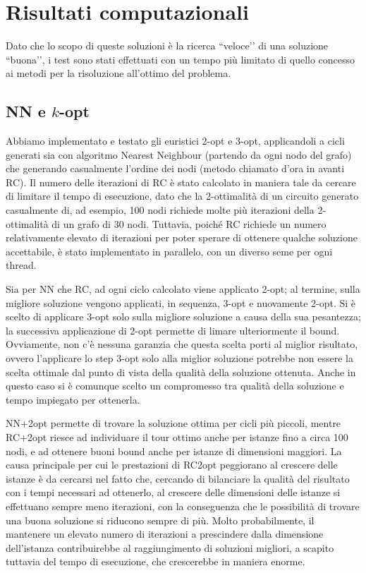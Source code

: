 \section{Risultati computazionali}
Dato che lo scopo di queste soluzioni è la ricerca ``veloce’’ di una soluzione ``buona’’, i test sono stati effettuati con un tempo più limitato di quello concesso ai metodi per la risoluzione all’ottimo del problema.
\subsection{NN e $k$-opt}
Abbiamo implementato e testato gli euristici 2-opt e 3-opt, applicandoli a cicli generati sia con algoritmo Nearest Neighbour (partendo da ogni nodo del grafo) che generando casualmente l’ordine dei nodi (metodo chiamato d’ora in avanti RC). Il numero delle iterazioni di RC è stato calcolato in maniera tale da cercare di limitare il tempo di esecuzione, dato che la 2-ottimalità di un circuito generato casualmente di, ad esempio, 100 nodi richiede molte più iterazioni della 2-ottimalità di un grafo di 30 nodi. Tuttavia, poiché RC richiede un numero relativamente elevato di iterazioni per poter sperare di ottenere qualche soluzione accettabile, è stato implementato in parallelo, con un diverso seme per ogni thread.

Sia per NN che RC, ad ogni ciclo calcolato viene applicato 2-opt; al termine, sulla migliore soluzione vengono applicati, in sequenza, 3-opt e nuovamente 2-opt. Si è scelto di applicare 3-opt solo sulla migliore soluzione a causa della sua pesantezza; la successiva applicazione di 2-opt permette di limare ulteriormente il bound. Ovviamente, non c’è nessuna garanzia che questa scelta porti al miglior risultato, ovvero l’applicare lo step 3-opt solo alla miglior soluzione potrebbe non essere la scelta ottimale dal punto di vista della qualità della soluzione ottenuta. Anche in questo caso si è comunque scelto un compromesso tra qualità della soluzione e tempo impiegato per ottenerla.

NN+2opt permette di trovare la soluzione ottima per cicli più piccoli, mentre RC+2opt riesce ad individuare il tour ottimo anche per istanze fino a circa 100 nodi, e ad ottenere buoni bound anche per istanze di dimensioni maggiori. La causa principale per cui le prestazioni di RC2opt peggiorano al crescere delle istanze è da cercarsi nel fatto che, cercando di bilanciare la qualità del risultato con i tempi necessari ad ottenerlo, al crescere delle dimensioni delle istanze si effettuano sempre meno iterazioni, con la conseguenza che le possibilità di trovare una buona soluzione si riducono sempre di più. Molto probabilmente, il mantenere un elevato numero di iterazioni a prescindere dalla dimensione dell’istanza contribuirebbe al raggiungimento di soluzioni migliori, a scapito tuttavia del tempo di esecuzione, che crescerebbe in maniera enorme.

